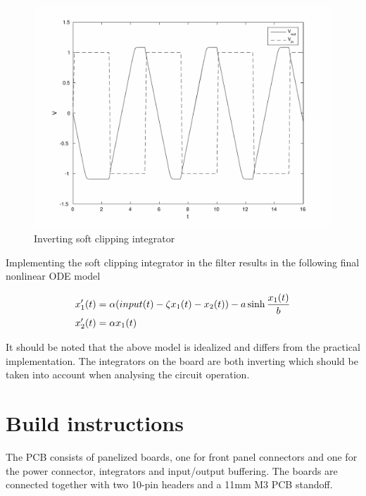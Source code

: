 \documentclass{article}
\begin{document}
\begin{figure}[H]\centering
  \includegraphics[page=1, scale=0.58]{inverting_clipping_integrator2.pdf}
  \caption{Inverting soft clipping integrator}
  \label{fig:integrator}
\end{figure}

Implementing the soft clipping integrator in the filter results in the following final nonlinear ODE model 

\begin{align}
\begin{split}
x_{1}'(t) &= \alpha \space (input(t) - \zeta \space x_{1}(t) - x_{2}(t)) - a \space \sinh \frac{x_{1}(t)}{b} \\
x_{2}'(t) &= \alpha \space x_{1}(t) \\
\end{split}
\end{align}

It should be noted that the above model is idealized and differs from the practical implementation. The integrators on the board are both inverting which should be taken into account when analysing the circuit operation. \newline

\section{Build instructions} \label{buildinstructions}

The PCB consists of panelized boards, one for front panel connectors and one for the power connector, integrators and input/output buffering. The boards are connected together with two 10-pin headers and a 11mm M3 PCB standoff.\newline
\end{document}
